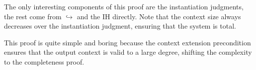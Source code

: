 \documentclass{article}
\begin{document}
The only interesting components of this proof are the instantiation judgments, the rest come from $\hookrightarrow$ and the IH directly. Note that the context size always decreases over the instantiation judgment, ensuring that the system is total.

This proof is quite simple and boring because the context extension precondition ensures that the output context is valid to a large degree, shifting the complexity to the completeness proof.
\end{document}
